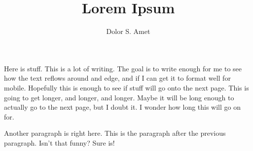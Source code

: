 \documentclass{article}
\begin{document}
\title{Lorem Ipsum}
\author{Dolor S. Amet}
\maketitle
Here is stuff.  This is a lot of writing.  The goal is to write enough for me to see how the text reflows around and edge, and if I can get it to format well for mobile.  Hopefully this is enough to see if stuff will go onto the next page.  This is going to get longer, and longer, and longer.  Maybe it will be long enough to actually go to the next page, but I doubt it.  I wonder how long this will go on for.

Another paragraph is right here.  This is the paragraph after the previous paragraph.  Isn't that funny?  Sure is!
\end{document}
